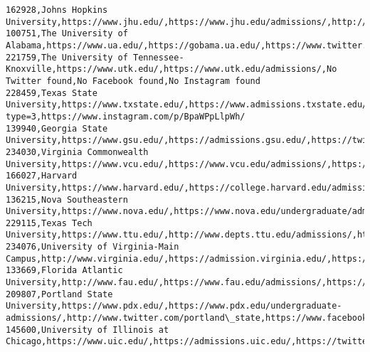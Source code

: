 \documentclass[11pt]{article}
\begin{document}
\begin{Verbatim}[commandchars=\\\{\}]
162928,Johns Hopkins University,https://www.jhu.edu/,https://www.jhu.edu/admissions/,http://www.twitter.com/JohnsHopkins,http://www.facebook.com/johnshopkinsuniversity,http://instagram.com/johnshopkinsu
100751,The University of Alabama,https://www.ua.edu/,https://gobama.ua.edu/,https://www.twitter.com/UofAlabama,https://www.facebook.com/UniversityofAlabama,https://www.instagram.com/univofalabama
221759,The University of Tennessee-Knoxville,https://www.utk.edu/,https://www.utk.edu/admissions/,No Twitter found,No Facebook found,No Instagram found
228459,Texas State University,https://www.txstate.edu/,https://www.admissions.txstate.edu/,https://twitter.com/txst,https://www.facebook.com/txstateu/photos/a.313278130566/10160856974535567/?type=3,https://www.instagram.com/p/BpaWPpLlpWh/
139940,Georgia State University,https://www.gsu.edu/,https://admissions.gsu.edu/,https://twitter.com/georgiastateu,https://www.facebook.com/GeorgiaStateUniversity,https://instagram.com/georgiastateuniversity
234030,Virginia Commonwealth University,https://www.vcu.edu/,https://www.vcu.edu/admissions/,https://twitter.com/VCU,http://www.facebook.com/virginiacommonwealthuniversity,https://www.instagram.com/p/BpZ3yQLAxPm/
166027,Harvard University,https://www.harvard.edu/,https://college.harvard.edu/admissions,http://twitter.com/harvartmuseums,http://facebook.com/harvard,http://www.instagram.com/harvard
136215,Nova Southeastern University,https://www.nova.edu/,https://www.nova.edu/undergraduate/admissions/index.html,http://www.twitter.com/nsuflorida,https://www.facebook.com/NSUFlorida,https://www.instagram.com/nsuflorida/
229115,Texas Tech University,https://www.ttu.edu/,http://www.depts.ttu.edu/admissions/,http://www.twitter.com/texastech/,http://www.facebook.com/TexasTechYou,https://www.instagram.com/texastech/
234076,University of Virginia-Main Campus,http://www.virginia.edu/,https://admission.virginia.edu/,https://twitter.com/uva,https://www.facebook.com/UniversityofVirginia,https://www.instagram.com/p/BpaOrYzFfZ8/
133669,Florida Atlantic University,http://www.fau.edu/,https://www.fau.edu/admissions/,https://twitter.com/FloridaAtlantic,//www.facebook.com/FloridaAtlantic,//instagram.com/FloridaAtlantic
209807,Portland State University,https://www.pdx.edu/,https://www.pdx.edu/undergraduate-admissions/,http://www.twitter.com/portland\_state,https://www.facebook.com/portlandstateu,https://www.instagram.com/portlandstate/
145600,University of Illinois at Chicago,https://www.uic.edu/,https://admissions.uic.edu/,https://twitter.com/thisisuic,https://www.facebook.com/uic.edu,https://instagram.com/uicamiridis/

\end{Verbatim}
\end{document}
